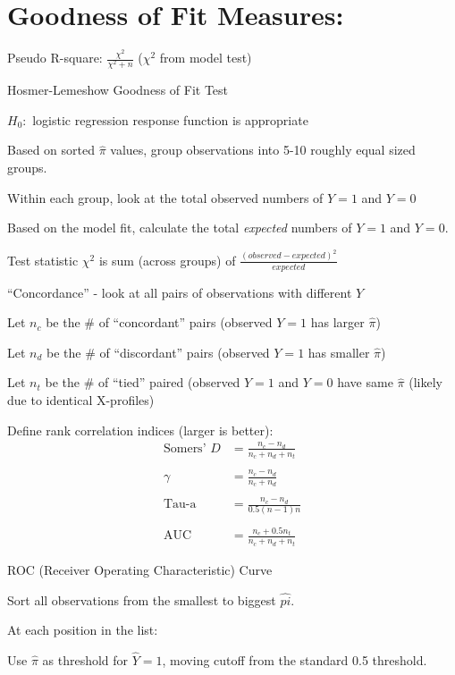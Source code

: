 \documentclass[12pt]{notes}
\begin{document}
\section{Goodness of Fit Measures:}
\bi
\item Pseudo R-square: $\frac{\chi^2}{\chi^2 +n}$ ($\chi^2$ from model test)
\item Hosmer-Lemeshow Goodness of Fit Test
\bi
\item $H_0:$ logistic regression response function is appropriate 
\item Based on sorted $\hat{\pi}$ values, group observations into 5-10 roughly equal sized groups. 
\item Within each group, look at the total observed numbers of $Y=1$ and $Y=0$
\item Based on the model fit, calculate the total \textit{expected} numbers of $Y=1$ and $Y=0$. 
\item Test statistic $\chi^2$ is sum (across groups) of $\frac{(observed - expected)^2}{expected}$
\ei
\item ``Concordance'' - look at all pairs of observations with different $Y$
\bi
\item Let $n_c$ be the \# of ``concordant'' pairs (observed $Y=1$ has larger $\hat{\pi}$)
\item Let $n_d$ be the \# of ``discordant'' pairs (observed $Y=1$ has smaller $\hat{\pi}$)
\item Let $n_t$ be the \# of ``tied'' paired (observed $Y=1$ and $Y=0$ have same $\hat{\pi}$ (likely due to identical X-profiles)
\item Define rank correlation indices (larger is better):
\begin{align*}
\text{Somers' }D &= \frac{n_c - n_d}{n_c+n_d+n_t} \\
\\
\gamma &= \frac{n_c-n_d}{n_c + n_d} \\
\\
\text{Tau-a} &= \frac{n_c - n_d}{0.5(n-1)n} \\
\\
\text{AUC} &=  \frac{n_c + 0.5n_t}{n_c+n_d+n_t} 
\end{align*}
\ei
\item ROC (Receiver Operating Characteristic) Curve
\bi
\item Sort all observations from the smallest to biggest $\hat{pi}.$
\item At each position in the list:
\bi
\item Use $\hat{\pi}$ as threshold for $\hat{Y} = 1$, moving cutoff from the standard 0.5 threshold. 
\end{document}
